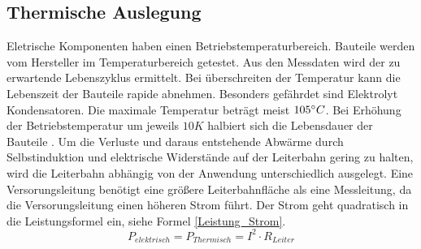 \documentclass[10pt,a4paper,oneside,abstracton]{scrartcl}
\newenvironment{Figure}
  {\par\medskip\noindent\minipage{\linewidth}}
  {\endminipage\par\medskip}
\begin{document}
\begin{multicols}{2}
\subsection{Thermische Auslegung}
Eletrische Komponenten haben einen Betriebstemperaturbereich. 
Bauteile werden vom Hersteller im Temperaturbereich getestet. 
Aus den Messdaten wird der zu erwartende Lebenszyklus ermittelt.  
Bei überschreiten der Temperatur kann die Lebenszeit der Bauteile rapide abnehmen. 
Besonders gefährdet sind Elektrolyt Kondensatoren. 
Die maximale Temperatur beträgt meist $ 105 \degree C $. \newline 
Bei Erhöhung der Betriebstemperatur um jeweils $ 10K $ halbiert sich die Lebensdauer der Bauteile \cite{Elko}.
\newline
Um die Verluste und daraus entstehende Abwärme durch Selbstinduktion und elektrische Widerstände  auf der Leiterbahn gering zu halten,
wird die Leiterbahn abhängig von der Anwendung unterschiedlich ausgelegt.
\newline
Eine Versorungsleitung benötigt eine größere Leiterbahnfläche als eine Messleitung, da die Versorungsleitung einen höheren Strom führt. 
Der Strom geht quadratisch in die Leistungsformel ein, siehe Formel \ref*{Leistung_Strom}. 
\begin{equation}
	P_{elektrisch} = P_{Thermisch} =  I^2 \cdot R_{Leiter} 
	\label{Leistung_Strom}
\end{equation}



\end{multicols}
\end{document}
